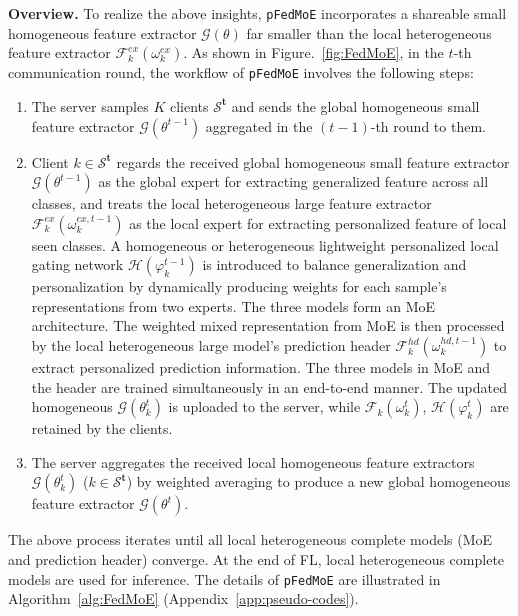 \documentclass[sigconf]{acmart}
\newcommand{\circled}[1]{\textcircled{\small #1}}
\newcommand{\hetero}{heterogeneous }
\newcommand{\homo}{homogeneous }
\newcommand{\pers}{personalized }
\newcommand{\gen}{generalized }
\newcommand{\persN}{personalization }
\newcommand{\genN}{generalization }
\newcommand{\fe}{feature extractor }
\newcommand{\methodname}{{\tt{pFedMoE}}}
\begin{document}
\textbf{Overview.} To realize the above insights, \methodname{} incorporates a shareable small \homo feature extractor $\mathcal{G}(\theta)$ far smaller than the local \hetero feature extractor $\mathcal{F}_k^{ex}(\omega_k^{ex})$. As shown in Figure.~\ref{fig:FedMoE}, in the $t$-th communication round, the workflow of \methodname{} involves the following steps:
\begin{enumerate}[label=\circled{\arabic*}]
    \item The server samples $K$ clients $\boldsymbol{\mathcal{S}^t}$ and sends the global \homo small \fe $\mathcal{G}(\theta^{{t}-{1}})$ aggregated in the $(t-1)$-th round to them.
    \item Client $k \in \boldsymbol{\mathcal{S}^t}$ regards the received global \homo small \fe $\mathcal{G}(\theta^{{t}-{1}})$ as the global expert for extracting \gen feature across all classes, and treats the local \hetero large \fe $\mathcal{F}_k^{ex}(\omega_k^{ex,t-1})$ as the local expert for extracting \pers feature of local seen classes. A \homo or heterogeneous lightweight \pers local gating network $\mathcal{H}(\varphi_k^{t-1})$ is introduced to balance \genN and \persN by dynamically producing weights for each sample's representations from two experts. The three models form an MoE architecture. The weighted mixed representation from MoE is then processed by the local \hetero large model's prediction header $\mathcal{F}_k^{hd}(\omega_k^{hd,t-1})$ to extract \pers prediction information. The three models in MoE and the header are trained simultaneously in an end-to-end manner. The updated \homo $\mathcal{G}(\theta_k^t)$ is uploaded to the server, while $\mathcal{F}_k(\omega_k^t)$, $\mathcal{H}(\varphi_k^t)$ are retained by the clients.
    \item The server aggregates the received local \homo feature extractors $\mathcal{G}(\theta_k^t)$ ($k \in \boldsymbol{\mathcal{S}^t}$) by weighted averaging to produce a new global \homo \fe $\mathcal{G}(\theta^{t})$.
\end{enumerate}
The above process iterates until all local \hetero complete models (MoE and prediction header) converge. At the end of FL, local \hetero complete models are used for inference. The details of \methodname{} are illustrated in Algorithm~\ref{alg:FedMoE} (Appendix~\ref{app:pseudo-codes}).
\end{document}
